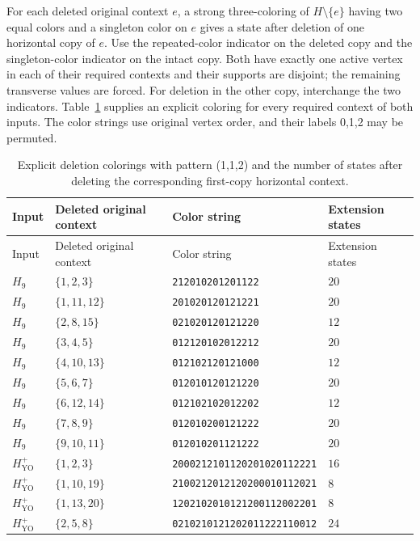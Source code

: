 \documentclass[aps,pra,reprint,superscriptaddress,longbibliography,nofootinbib,floatfix,10pt]{revtex4-2}
\theoremstyle{definition}
\newcommand{\YO}{\mathrm{YO}}
\begin{document}
For each deleted original context $e$, a strong three-coloring of
$H\setminus\{e\}$ having two equal colors and a singleton color on
$e$ gives a state after deletion of one horizontal copy of $e$.
Use the repeated-color indicator on the deleted copy and the
singleton-color indicator on the intact copy. Both have exactly
one active vertex in each of their required contexts and their
supports are disjoint; the remaining transverse values are forced.
For deletion in the other copy, interchange the two indicators.
Table~\ref{tab:deletion-colorings} supplies an explicit coloring for
every required context of both inputs. The color strings use original
vertex order, and their labels 0,1,2 may be permuted.
\begingroup\small
{}
\begin{longtable}{llll}
\caption{Explicit deletion colorings with pattern (1,1,2) and the number of states after deleting the corresponding first-copy horizontal context.}\label{tab:deletion-colorings}\\
\toprule
Input & Deleted original context & Color string & Extension states\\\midrule
\endfirsthead
\toprule
Input & Deleted original context & Color string & Extension states\\\midrule
\endhead
\bottomrule\endfoot
$H_9$ & $\{1,2,3\}$ & \texttt{212010201201122} & $20$\\
$H_9$ & $\{1,11,12\}$ & \texttt{201020120121221} & $20$\\
$H_9$ & $\{2,8,15\}$ & \texttt{021020120121220} & $12$\\
$H_9$ & $\{3,4,5\}$ & \texttt{012120102012212} & $20$\\
$H_9$ & $\{4,10,13\}$ & \texttt{012102120121000} & $12$\\
$H_9$ & $\{5,6,7\}$ & \texttt{012010120121220} & $20$\\
$H_9$ & $\{6,12,14\}$ & \texttt{012102102012202} & $12$\\
$H_9$ & $\{7,8,9\}$ & \texttt{012010200121222} & $20$\\
$H_9$ & $\{9,10,11\}$ & \texttt{012010201121222} & $20$\\
$H_{\YO}^+$ & $\{1,2,3\}$ & \texttt{2000212101120201020112221} & $16$\\
$H_{\YO}^+$ & $\{1,10,19\}$ & \texttt{2100212012120200010112021} & $8$\\
$H_{\YO}^+$ & $\{1,13,20\}$ & \texttt{1202102010121200112002201} & $8$\\
$H_{\YO}^+$ & $\{2,5,8\}$ & \texttt{0210210121202011222110012} & $24$\\

\end{longtable}
\end{document}
